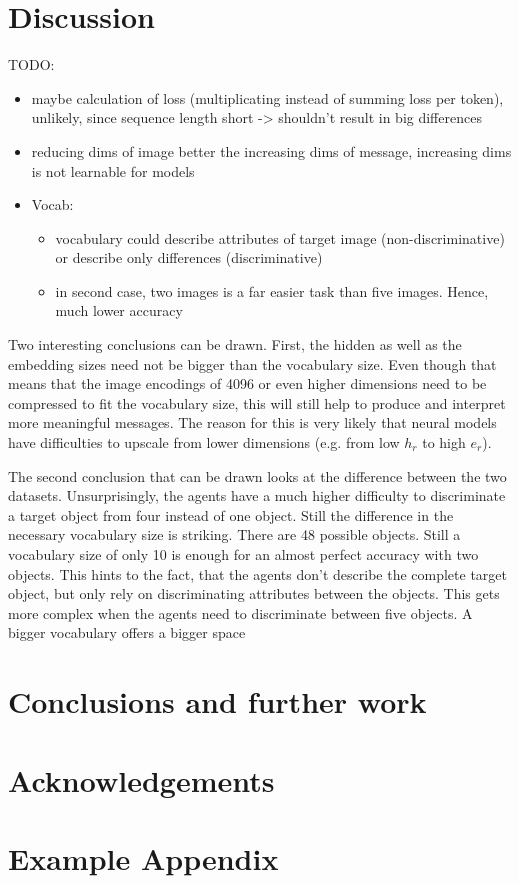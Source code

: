 \documentclass[11pt]{article}
\begin{document}
\section{Discussion}
TODO:
\begin{itemize}
  \item maybe calculation of loss (multiplicating instead of summing loss per token), unlikely, since sequence length short -> shouldn't result in big differences
  \item reducing dims of image better the increasing dims of message, increasing dims is not learnable for models
  \item Vocab:
        \begin{itemize}
          \item vocabulary could describe attributes of target image (non-discriminative) or describe only differences (discriminative)
          \item in second case, two images is a far easier task than five images. Hence, much lower accuracy
        \end{itemize}
\end{itemize}

Two interesting conclusions can be drawn. First, the hidden as well as the embedding sizes need not be bigger than the vocabulary size. Even though that means that the image encodings of 4096 or even higher dimensions need to be compressed to fit the vocabulary size, this will still help to produce and interpret more meaningful messages. The reason for this is very likely that neural models have difficulties to upscale from lower dimensions (e.g. from low $h_r$ to high $e_r$).

The second conclusion that can be drawn looks at the difference between the two datasets. Unsurprisingly, the agents have a much higher difficulty to discriminate a target object from four instead of one object. Still the difference in the necessary vocabulary size is striking. There are 48 possible objects. Still a vocabulary size of only 10 is enough for an almost perfect accuracy with two objects. This hints to the fact, that the agents don't describe the complete target object, but only rely on discriminating attributes between the objects. This gets more complex when the agents need to discriminate between five objects. A bigger vocabulary offers a bigger space


\section{Conclusions and further work}

\section*{Acknowledgements}




\appendix

\section{Example Appendix}
\end{document}
